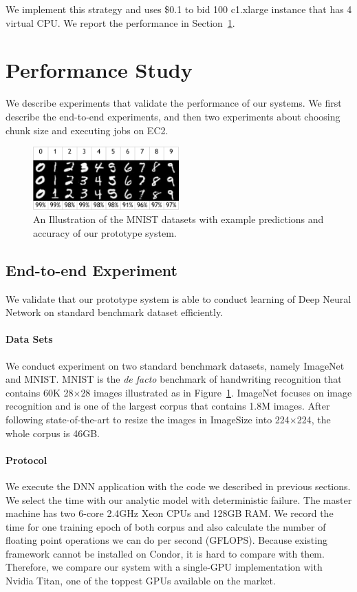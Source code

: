 \documentclass[11pt]{article}
\begin{document}
We implement this strategy and uses \$0.1 to bid 100 c1.xlarge
instance that has 4 virtual CPU. We report the performance in 
Section~\ref{sec:perf}.

\section{Performance Study} \label{sec:perf}

We describe experiments that validate the performance of our systems.
We first describe the end-to-end experiments, and then two
experiments about choosing chunk size and executing jobs on EC2.

\begin{figure}[t]
\centering
\includegraphics[width=0.5\textwidth]{figures/result-crop}
\caption{An Illustration of the MNIST datasets with
example predictions and accuracy of our prototype system.}
\label{fig:mnist}
\end{figure}


\subsection{End-to-end Experiment}

We validate that our prototype system is able to conduct
learning of Deep Neural Network on standard benchmark dataset
efficiently.

\paragraph*{Data Sets} We conduct experiment on two standard
benchmark datasets, namely ImageNet and MNIST. MNIST is the
{\em de facto} benchmark of handwriting recognition that contains
60K 28$\times$28 images illustrated as in Figure~\ref{fig:mnist}. ImageNet
focuses on image recognition and is one of the largest corpus
that contains 1.8M images. After following state-of-the-art to
resize the images in ImageSize into 224$\times$224, the whole
corpus is 46GB.

\paragraph*{Protocol} We execute the DNN application with the
code we described in previous sections. We select the time with
our analytic model with deterministic failure. The master
machine has two 6-core 2.4GHz Xeon CPUs and 128GB RAM.
We record the time for one training epoch of both corpus
and also calculate the number of floating point operations
we can do per second (GFLOPS). Because existing framework
cannot be installed on Condor, it is hard to compare with them.
Therefore, we compare our system with a single-GPU implementation
with Nvidia Titan, one of the toppest GPUs available on the market.
\end{document}
